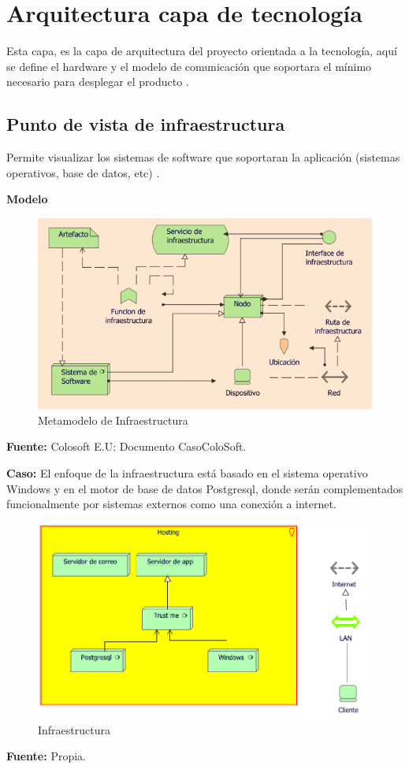 \section{Arquitectura capa de tecnología}
{Esta capa, es la capa de arquitectura del proyecto orientada a la tecnología, aquí se define el hardware y el modelo de comunicación que soportara el mínimo necesario para desplegar el producto \cite{archimate}.}

	\subsection{Punto de vista de infraestructura}
	{Permite visualizar los sistemas de software que soportaran la aplicación (sistemas operativos, base de datos, etc) \cite{archimate}.
	\newpage
		
		\textbf{Modelo}\\
		\begin{figure}[H]
			\centering
			\includegraphics[width=0.7\linewidth]{development/infraestructura.png}
			\caption{Metamodelo de Infraestructura}
		\end{figure}
		\begin{center}
			\textbf{Fuente:} Colosoft E.U: Documento CasoColoSoft.
		\end{center}
		\hfill
	
		\textbf{Caso:} El enfoque de la infraestructura está basado en el sistema operativo Windows y en el motor de base de datos Postgresql, donde serán complementados funcionalmente por sistemas externos como una conexión a internet.
		
		\begin{figure}[H]
			\centering
			\includegraphics[width=0.8\linewidth]{development/infraestructura.pdf}
			\caption{Infraestructura}
		\end{figure}
		\begin{center}
			\textbf{Fuente:} Propia.
		\end{center}
	}
	
